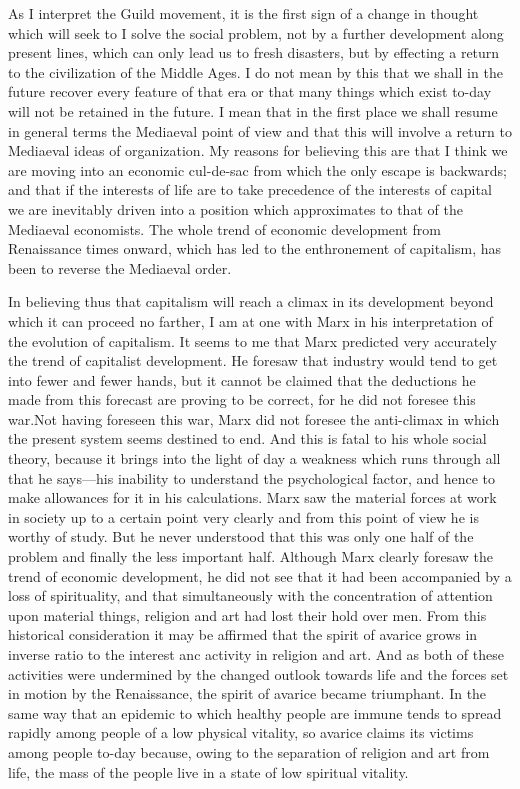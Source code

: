 \documentclass{book}
\begin{document}
As I interpret the Guild movement, it is the first sign of a change in thought which will seek to I solve the social problem, not by a further development along present lines, which can only lead us to fresh disasters, but by effecting a return to the civilization of the Middle Ages. I do not mean by this that we shall in the future recover every feature of that era or that many things which exist to-day will not be retained in the future. I mean that in the first place we shall resume in general terms the Mediaeval point of view and that this will involve a return to Mediaeval ideas of organization. My reasons for believing this are that I think we are moving into an economic cul-de-sac from which the only escape is backwards; and that if the interests of life are to take precedence of the interests of capital we are inevitably driven into a position which approximates to that of the Mediaeval economists. The whole trend of economic development from Renaissance times onward, which has led to the enthronement of capitalism, has been to reverse the Mediaeval order.

In believing thus that capitalism will reach a climax in its development beyond which it can proceed no farther, I am at one with Marx in his interpretation of the evolution of capitalism. It seems to me that Marx predicted very accurately the trend of capitalist development. He foresaw that industry would tend to get into fewer and fewer hands, but it cannot be claimed that the deductions he made from this forecast are proving to be correct, for he did not foresee this war.\footnotemark[2] Not having foreseen this war, Marx did not foresee the anti-climax in which the present system seems destined to end. And this is fatal to his whole social theory, because it brings into the light of day a weakness which runs through all that he says—his inability to understand the psychological factor, and hence to make allowances for it in his calculations. Marx saw the material forces at work in society up to a certain point very clearly and from this point of view he is worthy of study. But he never understood that this was only one half of the problem and finally the less important half. Although Marx clearly foresaw the trend of economic development, he did not see that it had been accompanied by a loss of spirituality, and that simultaneously with the concentration of attention upon material things, religion and art had lost their hold over men. From this historical consideration it may be affirmed that the spirit of avarice grows in inverse ratio to the interest anc activity in religion and art. And as both of these activities were undermined by the changed outlook towards life and the forces set in motion by the Renaissance, the spirit of avarice became triumphant. In the same way that an epidemic to which healthy people are immune tends to spread rapidly among people of a low physical vitality, so avarice claims its victims among people to-day because, owing to the separation of religion and art from life, the mass of the people live in a state of low spiritual vitality.
\end{document}
